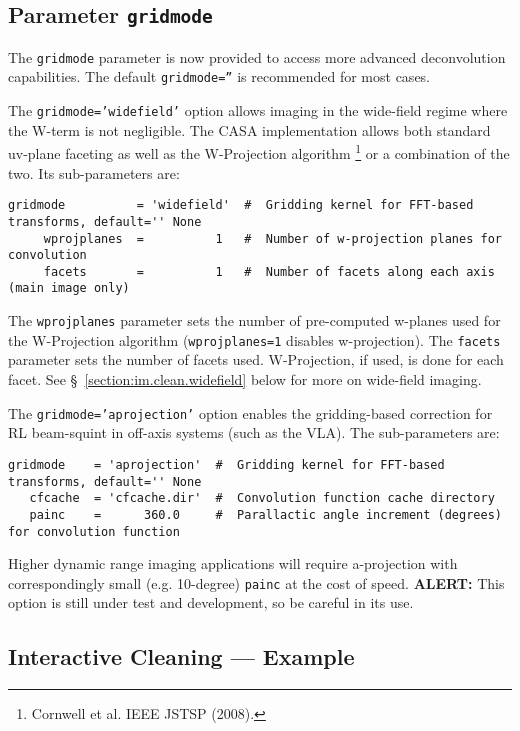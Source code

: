 \subsection{Parameter {\tt gridmode} }
\label{section:im.clean.gridmode}

The {\tt gridmode} parameter is now provided to access more
advanced deconvolution capabilities.  The default 
{\tt gridmode=''} is recommended for most cases.

The {\tt gridmode='widefield'} option allows imaging in the
wide-field regime where the W-term is not negligible.  The
CASA implementation allows both standard uv-plane faceting as
well as the W-Projection algorithm
\footnote{Cornwell et al. IEEE JSTSP (2008).}
or a combination of the two.  Its sub-parameters are:
\small
\begin{verbatim}
gridmode          = 'widefield'  #  Gridding kernel for FFT-based transforms, default='' None
     wprojplanes  =          1   #  Number of w-projection planes for convolution
     facets       =          1   #  Number of facets along each axis (main image only)
\end{verbatim}
\normalsize
The {\tt wprojplanes} parameter sets the number of pre-computed w-planes
used for the W-Projection algorithm ({\tt wprojplanes=1} disables
w-projection).  The {\tt facets} parameter sets the number of facets
used.  W-Projection, if used, is done for each facet.
See \S~\ref{section:im.clean.widefield} below for more on wide-field
imaging. 

The {\tt gridmode='aprojection'} option enables the gridding-based
correction for RL beam-squint in off-axis systems (such as the VLA).
The sub-parameters are:
\small
\begin{verbatim}
gridmode    = 'aprojection'  #  Gridding kernel for FFT-based transforms, default='' None
   cfcache  = 'cfcache.dir'  #  Convolution function cache directory
   painc    =      360.0     #  Parallactic angle increment (degrees) for convolution function
\end{verbatim}
\normalsize
Higher dynamic range imaging applications will require a-projection
with correspondingly small (e.g. 10-degree) {\tt painc} at the cost of
speed.  {\bf ALERT:} This option is still under test and development,
so be careful in its use.

\subsection{Interactive Cleaning --- Example}
\label{section:im.clean.exampleinteractive}

